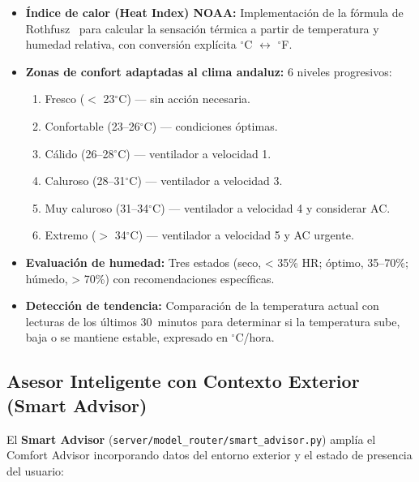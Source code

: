 \begin{itemize}
    \item \textbf{Índice de calor (Heat Index) NOAA:} Implementación de la fórmula de Rothfusz~\cite{rothfusz_1990} para calcular la sensación térmica a partir de temperatura y humedad relativa, con conversión explícita $^\circ$C $\leftrightarrow$ $^\circ$F.
    \item \textbf{Zonas de confort adaptadas al clima andaluz:} 6 niveles progresivos:
    \begin{enumerate}
        \item Fresco ($<$ 23$^\circ$C) --- sin acción necesaria.
        \item Confortable (23--26$^\circ$C) --- condiciones óptimas.
        \item Cálido (26--28$^\circ$C) --- ventilador a velocidad 1.
        \item Caluroso (28--31$^\circ$C) --- ventilador a velocidad 3.
        \item Muy caluroso (31--34$^\circ$C) --- ventilador a velocidad 4 y considerar AC.
        \item Extremo ($>$ 34$^\circ$C) --- ventilador a velocidad 5 y AC urgente.
    \end{enumerate}
    \item \textbf{Evaluación de humedad:} Tres estados (seco, < 35\% HR; óptimo, 35--70\%; húmedo, > 70\%) con recomendaciones específicas.
    \item \textbf{Detección de tendencia:} Comparación de la temperatura actual con lecturas de los últimos 30~minutos para determinar si la temperatura sube, baja o se mantiene estable, expresado en $^\circ$C/hora.
\end{itemize}

\subsection{Asesor Inteligente con Contexto Exterior (Smart Advisor)}
\label{sec:smart_advisor}

El \textbf{Smart Advisor} (\texttt{server/model\_router/smart\_advisor.py}) amplía el Comfort Advisor incorporando datos del entorno exterior y el estado de presencia del usuario:

